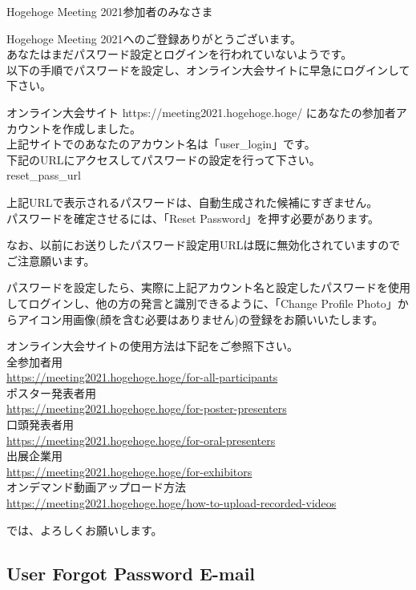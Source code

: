 \documentclass[titlepage,10pt,a4paper,uplatex]{jsbook}
\newenvironment{content}{\begin{shaded}\vspace{-1em}\raggedright\ttfamily\footnotesize\setlength{\baselineskip}{1.4em}}{\end{shaded}\vspace{-1em}}
\begin{document}
\begin{content}
Hogehoge Meeting 2021参加者のみなさま

Hogehoge Meeting 2021へのご登録ありがとうございます。\\
あなたはまだパスワード設定とログインを行われていないようです。\\
以下の手順でパスワードを設定し、オンライン大会サイトに早急にログインして下さい。

オンライン大会サイト https://meeting2021.hogehoge.hoge/ にあなたの参加者アカウントを作成しました。\\
上記サイトでのあなたのアカウント名は「{\lbrack}user\_login{\rbrack}」です。\\
下記のURLにアクセスしてパスワードの設定を行って下さい。\\
{\lbrack}reset\_pass\_url{\rbrack}

上記URLで表示されるパスワードは、自動生成された候補にすぎません。\\
パスワードを確定させるには、「Reset Password」を押す必要があります。

なお、以前にお送りしたパスワード設定用URLは既に無効化されていますのでご注意願います。

パスワードを設定したら、実際に上記アカウント名と設定したパスワードを使用してログインし、他の方の発言と識別できるように、「Change Profile Photo」からアイコン用画像(顔を含む必要はありません)の登録をお願いいたします。

オンライン大会サイトの使用方法は下記をご参照下さい。\\
全参加者用\\
\url{https://meeting2021.hogehoge.hoge/for-all-participants}\\
ポスター発表者用\\
\url{https://meeting2021.hogehoge.hoge/for-poster-presenters}\\
口頭発表者用\\
\url{https://meeting2021.hogehoge.hoge/for-oral-presenters}\\
出展企業用\\
\url{https://meeting2021.hogehoge.hoge/for-exhibitors}\\
オンデマンド動画アップロード方法\\
\url{https://meeting2021.hogehoge.hoge/how-to-upload-recorded-videos}

では、よろしくお願いします。
\end{content}

\subsection{User Forgot Password E-mail}
\end{document}
